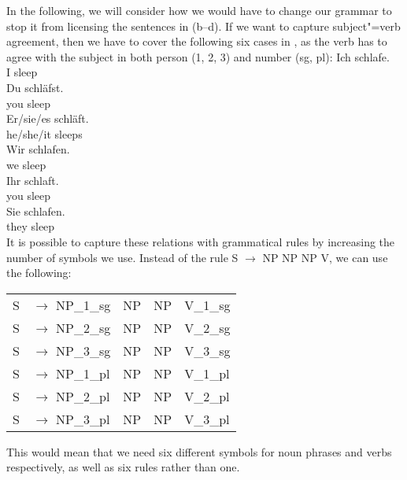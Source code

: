 In the following, we will consider how we would have to change our grammar to stop it from licensing the sentences in (b--d).
If we want to capture subject"=verb agreement, then we have to cover the following six cases in , as the verb has to agree with the
subject in both person (1, 2, 3) and number (sg, pl):
\eal\jamwidth=7cm\relax%
\ex 
\gll Ich schlafe.\\
     I   sleep\\      
\ex 
\gll Du schläfst.\\
     you sleep\\      
\ex 
\gll Er/sie/es schläft.\\
     he/she/it sleeps\\      
\ex 
\gll Wir schlafen.\\
     we sleep\\       
\ex 
\gll Ihr schlaft.\\
     you sleep\\       
\ex 
\gll Sie schlafen.\\   
     they sleep\\      
\zl
It is possible to capture these relations with grammatical rules by increasing 
the number of symbols we use. Instead of the rule S $\to$ NP NP NP V, we can use
the following:
\ea
\begin{tabular}[t]{@{}l@{ }l@{~~}l@{~~}l@{~~}l}
S  & $\to$ NP\_1\_sg & NP & NP & V\_1\_sg\\
S  & $\to$ NP\_2\_sg & NP & NP & V\_2\_sg\\
S  & $\to$ NP\_3\_sg & NP & NP & V\_3\_sg\\
S  & $\to$ NP\_1\_pl & NP & NP & V\_1\_pl\\
S  & $\to$ NP\_2\_pl & NP & NP & V\_2\_pl\\
S  & $\to$ NP\_3\_pl & NP & NP & V\_3\_pl\\
\end{tabular}
\z
This would mean that we need six different symbols for noun phrases and verbs respectively, as well as six rules rather than one.

